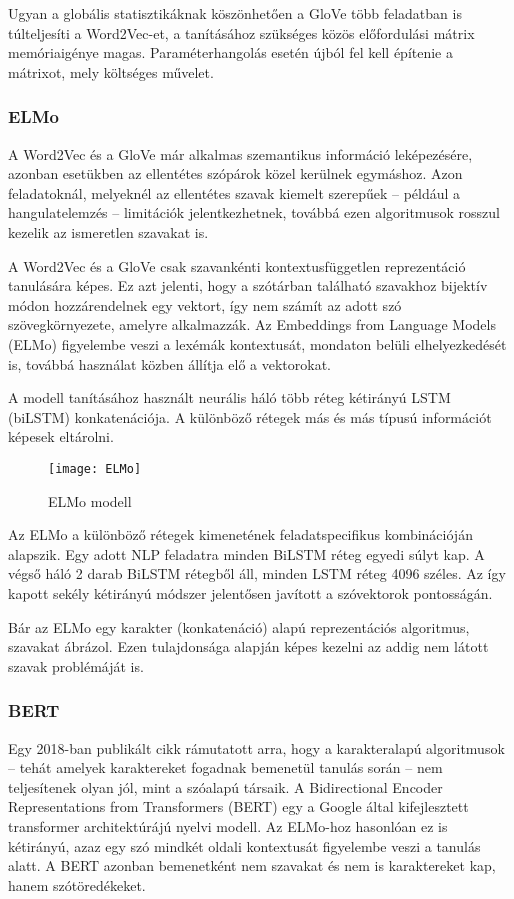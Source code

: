 Ugyan a globális statisztikáknak köszönhetően a GloVe több feladatban is túlteljesíti a Word2Vec-et, a tanításához szükséges közös előfordulási mátrix memóriaigénye magas. Paraméterhangolás esetén újból fel kell építenie a mátrixot, mely költséges művelet.

\subsubsection{ELMo}
A Word2Vec és a GloVe már alkalmas szemantikus információ leképezésére, azonban esetükben az ellentétes szópárok közel kerülnek egymáshoz. Azon feladatoknál, melyeknél az ellentétes szavak kiemelt szerepűek – például a hangulatelemzés – limitációk jelentkezhetnek, továbbá ezen algoritmusok rosszul kezelik az ismeretlen szavakat is.

A Word2Vec és a GloVe csak szavankénti kontextusfüggetlen reprezentáció tanulására képes. Ez azt jelenti, hogy a szótárban található szavakhoz bijektív módon hozzárendelnek egy vektort, így nem számít az adott szó szövegkörnyezete, amelyre alkalmazzák. Az Embeddings from Language Models (ELMo) \cite{elmo} figyelembe veszi a lexémák kontextusát, mondaton belüli elhelyezkedését is, továbbá használat közben állítja elő a vektorokat.

A modell tanításához használt neurális háló több réteg kétirányú LSTM (biLSTM) konkatenációja. A különböző rétegek más és más típusú információt képesek eltárolni.

\begin{figure}[H]
	\centering
	\texttt{[image: ELMo]}
	\caption{ELMo modell}
\end{figure}

Az ELMo a különböző rétegek kimenetének feladatspecifikus kombinációján alapszik. Egy adott NLP feladatra minden BiLSTM réteg egyedi súlyt kap. A végső háló 2 darab BiLSTM rétegből áll, minden LSTM réteg 4096 széles.
Az így kapott sekély kétirányú módszer jelentősen javított a szóvektorok pontosságán.

Bár az ELMo egy karakter (konkatenáció) alapú reprezentációs algoritmus, szavakat ábrázol. Ezen tulajdonsága alapján képes kezelni az addig nem látott szavak problémáját is.


\subsubsection{BERT}
Egy 2018-ban publikált cikk \cite{char} rámutatott arra, hogy a karakteralapú algoritmusok – tehát amelyek karaktereket fogadnak bemenetül tanulás során – nem teljesítenek olyan jól, mint a szóalapú társaik. A Bidirectional Encoder Representations from Transformers (BERT) \cite{2018arXiv181004805D} egy a Google által kifejlesztett transformer architektúrájú nyelvi modell. Az ELMo-hoz hasonlóan ez is kétirányú, azaz egy szó mindkét oldali kontextusát figyelembe veszi a tanulás alatt. A BERT azonban bemenetként nem szavakat és nem is karaktereket kap, hanem szótöredékeket.

